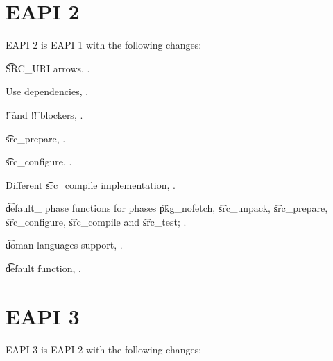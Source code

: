 \section*{EAPI 2}

EAPI 2 is EAPI 1 with the following changes:

\begin{compactitem}
\item \t{SRC\_URI} arrows, .
\item Use dependencies, .
\item \t{!} and \t{!!} blockers, .
\item \t{src\_prepare}, .
\item \t{src\_configure}, .
\item Different \t{src\_compile} implementation, .
\item \t{default\_} phase functions for phases \t{pkg\_nofetch}, \t{src\_unpack}, \t{src\_prepare},
    \t{src\_configure}, \t{src\_compile} and \t{src\_test}; .
\item \t{doman} languages support, .
\item \t{default} function, .
\end{compactitem}

\section*{EAPI 3}

EAPI 3 is EAPI 2 with the following changes:

